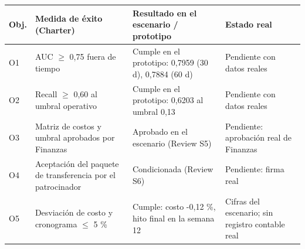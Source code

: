 \footnotesize
\begin{tabularx}{\linewidth}{l X X p{3.4cm}}
\toprule
\textbf{Obj.} & \textbf{Medida de éxito (Charter)} & \textbf{Resultado en el escenario / prototipo} & \textbf{Estado real} \\
\midrule
O1 & AUC $\geq$ 0,75 fuera de tiempo & Cumple en el prototipo: 0,7959 (30 d), 0,7884 (60 d) & Pendiente con datos reales \\
O2 & Recall $\geq$ 0,60 al umbral operativo & Cumple en el prototipo: 0,6203 al umbral 0,13 & Pendiente con datos reales \\
O3 & Matriz de costos y umbral aprobados por Finanzas & Aprobado en el escenario (Review S5) & Pendiente: aprobación real de Finanzas \\
O4 & Aceptación del paquete de transferencia por el patrocinador & Condicionada (Review S6) & Pendiente: firma real \\
O5 & Desviación de costo y cronograma $\leq$ 5 \% & Cumple: costo -0,12 \%, hito final en la semana 12 & Cifras del escenario; sin registro contable real \\
\bottomrule
\end{tabularx}
